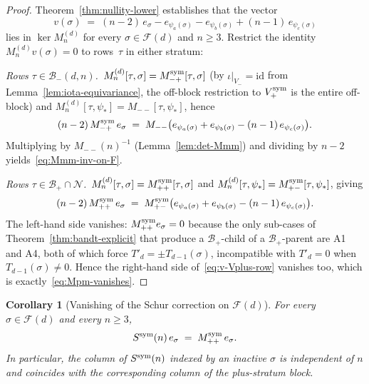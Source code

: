 \documentclass{amsart}
\newtheorem{corollary}[theorem]{Corollary}
\theoremstyle{definition}
\theoremstyle{remark}
\begin{document}
\begin{proof}
Theorem~\ref{thm:nullity-lower} establishes that the vector
\[
  v(\sigma) \;=\; (n-2)\,e_\sigma - e_{\psi_a(\sigma)}
            - e_{\psi_b(\sigma)} + (n-1)\,e_{\psi_c(\sigma)}
\]
lies in $\ker M_n^{(d)}$ for every $\sigma \in \mathcal{F}(d)$ and
$n \ge 3$.  Restrict the identity $M_n^{(d)} v(\sigma) = 0$
to rows~$\tau$ in either stratum:

\smallskip\noindent\emph{Rows $\tau \in \mathcal{B}_-(d, n)$.}\
$M_n^{(d)}[\tau, \sigma] = M_{-+}^{\rm sym}[\tau, \sigma]$ (by
$\iota|_{V_-} = \mathrm{id}$ from
Lemma~\ref{lem:iota-equivariance}, the off-block restriction
to $V_+^{\rm sym}$ is the entire off-block) and
$M_n^{(d)}[\tau, \psi_*] = M_{--}[\tau, \psi_*]$, hence
\begin{equation}\label{eq:v-Vminus-row}
  (n-2)\,M_{-+}^{\rm sym}\, e_\sigma
  \;=\; M_{--}\bigl(e_{\psi_a(\sigma)} + e_{\psi_b(\sigma)}
            - (n-1)\,e_{\psi_c(\sigma)}\bigr).
\end{equation}
Multiplying by $M_{--}(n)^{-1}$ (Lemma~\ref{lem:det-Mmm}) and
dividing by $n-2$ yields~\eqref{eq:Mmm-inv-on-F}.

\smallskip\noindent\emph{Rows $\tau \in \mathcal{B}_+ \cap \mathcal{N}$.}\
$M_n^{(d)}[\tau, \sigma] = M_{++}^{\rm sym}[\tau, \sigma]$ and
$M_n^{(d)}[\tau, \psi_*] = M_{+-}^{\rm sym}[\tau, \psi_*]$,
giving
\begin{equation}\label{eq:v-Vplus-row}
  (n-2)\,M_{++}^{\rm sym}\, e_\sigma
  \;=\; M_{+-}^{\rm sym}\bigl(e_{\psi_a(\sigma)}
            + e_{\psi_b(\sigma)} - (n-1)\,e_{\psi_c(\sigma)}\bigr).
\end{equation}
The left-hand side vanishes:
$M_{++}^{\rm sym} e_\sigma = 0$ because the only sub-cases of
Theorem~\ref{thm:bandt-explicit} that produce a
$\mathcal{B}_+$-child of a $\mathcal{B}_+$-parent are A1 and A4,
both of which force $T'_d = \pm T_{d-1}(\sigma)$, incompatible
with $T'_d = 0$ when $T_{d-1}(\sigma) \neq 0$.  Hence the
right-hand side of~\eqref{eq:v-Vplus-row} vanishes too, which
is exactly~\eqref{eq:Mpm-vanishes}.
\end{proof}

\begin{corollary}[Vanishing of the Schur correction on $\mathcal{F}(d)$]
\label{cor:schur-vanishes-on-F}
For every $\sigma \in \mathcal{F}(d)$ and every $n \ge 3$,
\begin{equation}\label{eq:Spsym-on-F}
  S^{\rm sym}(n)\,e_\sigma
  \;=\; M_{++}^{\rm sym}\, e_\sigma.
\end{equation}
In particular, the column of $S^{\rm sym}(n)$ indexed by an
inactive $\sigma$ is independent of $n$ and coincides with the
corresponding column of the plus-stratum block.
\end{corollary}
\end{document}
